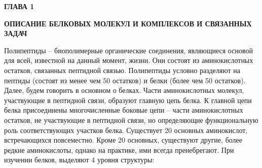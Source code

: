\newpage
\begin{center}
	\textbf{\large ГЛАВА 1}

	\textbf{\large ОПИСАНИЕ БЕЛКОВЫХ МОЛЕКУЛ И КОМПЛЕКСОВ И СВЯЗАННЫХ ЗАДАЧ}
\end{center}


Полипептиды – биополимерные органические соединения, являющиеся основой для всей, известной на данный момент, жизни. Они состоят из аминокислотных остатков, связанных пептидной связью. Полипептиды условно разделяют на пептиды (состоят из менее чем 50 остатков) и белки (более чем 50 остатков). Далее, будем говорить в основном о белках. Части аминокислотных молекул, участвующие в пептидной связи, образуют главную цепь белка. К главной цепи белка присоединены многочисленные боковые цепи – части аминокислотных остатков, не участвующие в пептидной связи, но определяющие функциональную роль соответствующих участков белка. Существует 20 основных аминокислот, встречающихся повсеместно. Кроме 20 основных, существуют другие, более редкие аминокислоты, однако на практике, ими всегда пренебрегают. При изучении белков, выделяют 4 уровня структуры:
